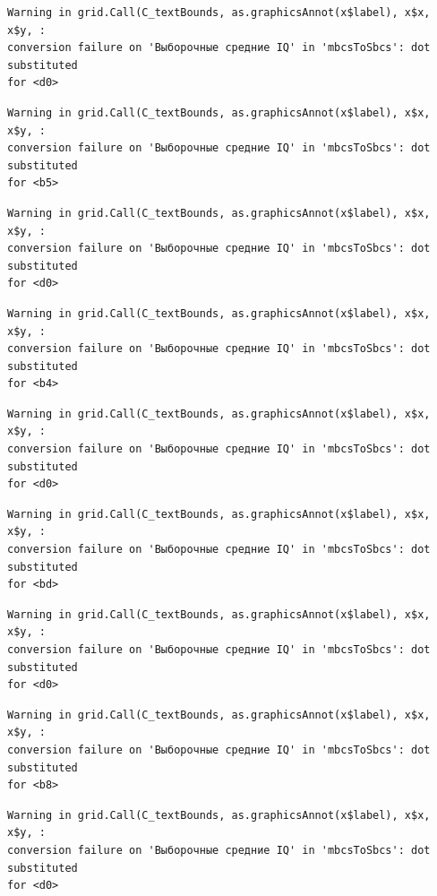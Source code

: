 \documentclass[
  letterpaper,
  DIV=11,
  numbers=noendperiod]{scrreprt}
\theoremstyle{definition}
\theoremstyle{remark}
\begin{document}
\begin{verbatim}
Warning in grid.Call(C_textBounds, as.graphicsAnnot(x$label), x$x, x$y, :
conversion failure on 'Выборочные средние IQ' in 'mbcsToSbcs': dot substituted
for <d0>
\end{verbatim}

\begin{verbatim}
Warning in grid.Call(C_textBounds, as.graphicsAnnot(x$label), x$x, x$y, :
conversion failure on 'Выборочные средние IQ' in 'mbcsToSbcs': dot substituted
for <b5>
\end{verbatim}

\begin{verbatim}
Warning in grid.Call(C_textBounds, as.graphicsAnnot(x$label), x$x, x$y, :
conversion failure on 'Выборочные средние IQ' in 'mbcsToSbcs': dot substituted
for <d0>
\end{verbatim}

\begin{verbatim}
Warning in grid.Call(C_textBounds, as.graphicsAnnot(x$label), x$x, x$y, :
conversion failure on 'Выборочные средние IQ' in 'mbcsToSbcs': dot substituted
for <b4>
\end{verbatim}

\begin{verbatim}
Warning in grid.Call(C_textBounds, as.graphicsAnnot(x$label), x$x, x$y, :
conversion failure on 'Выборочные средние IQ' in 'mbcsToSbcs': dot substituted
for <d0>
\end{verbatim}

\begin{verbatim}
Warning in grid.Call(C_textBounds, as.graphicsAnnot(x$label), x$x, x$y, :
conversion failure on 'Выборочные средние IQ' in 'mbcsToSbcs': dot substituted
for <bd>
\end{verbatim}

\begin{verbatim}
Warning in grid.Call(C_textBounds, as.graphicsAnnot(x$label), x$x, x$y, :
conversion failure on 'Выборочные средние IQ' in 'mbcsToSbcs': dot substituted
for <d0>
\end{verbatim}

\begin{verbatim}
Warning in grid.Call(C_textBounds, as.graphicsAnnot(x$label), x$x, x$y, :
conversion failure on 'Выборочные средние IQ' in 'mbcsToSbcs': dot substituted
for <b8>
\end{verbatim}

\begin{verbatim}
Warning in grid.Call(C_textBounds, as.graphicsAnnot(x$label), x$x, x$y, :
conversion failure on 'Выборочные средние IQ' in 'mbcsToSbcs': dot substituted
for <d0>
\end{verbatim}
\end{document}
